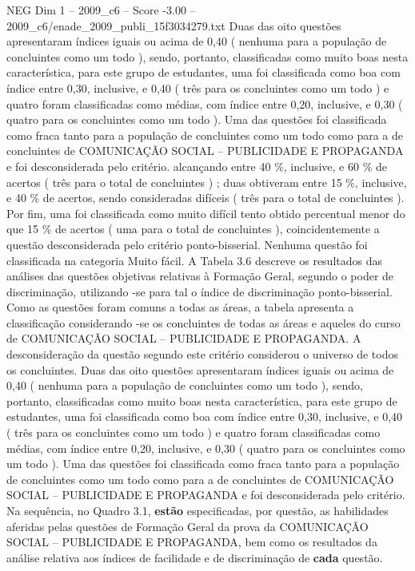 \begin{textsample}{NEG Dim 1 – 2009\_c6 – Score -3.00 – 2009\_c6/enade\_2009\_publi\_15f3034279.txt}
Duas das oito questões apresentaram índices iguais ou acima de 0,40 ( nenhuma para a população de concluintes como um todo ), sendo, portanto, classificadas como muito boas nesta característica, para este grupo de estudantes, uma foi classificada como boa com índice entre 0,30, inclusive, e 0,40 ( três para os concluintes como um todo ) e quatro foram classificadas como médias, com índice entre 0,20, inclusive, e 0,30 ( quatro para os concluintes como um todo ).
Uma das questões foi classificada como fraca tanto para a população de concluintes como um todo como para a de concluintes de COMUNICAÇÃO SOCIAL – PUBLICIDADE E PROPAGANDA e foi desconsiderada pelo critério. alcançando entre 40 \%, inclusive, e 60 \% de acertos ( três para o total de concluintes ) ; duas obtiveram entre 15 \%, inclusive, e 40 \% de acertos, sendo consideradas difíceis ( três para o total de concluintes ).
Por fim, uma foi classificada como muito difícil tento obtido percentual menor do que 15 \% de acertos ( uma para o total de concluintes ), coincidentemente a questão desconsiderada pelo critério ponto-bisserial.
Nenhuma questão foi classificada na categoria Muito fácil.
A Tabela 3.6 descreve os resultados das análises das questões objetivas relativas à Formação Geral, segundo o poder de discriminação, utilizando -se para tal o índice de discriminação ponto-bisserial.
Como as questões foram comuns a todas as áreas, a tabela apresenta a classificação considerando -se os concluintes de todas as áreas e aqueles do curso de COMUNICAÇÃO SOCIAL – PUBLICIDADE E PROPAGANDA.
A desconsideração da questão segundo este critério considerou o universo de todos os concluintes.
Duas das oito questões apresentaram índices iguais ou acima de 0,40 ( nenhuma para a população de concluintes como um todo ), sendo, portanto, classificadas como muito boas nesta característica, para este grupo de estudantes, uma foi classificada como boa com índice entre 0,30, inclusive, e 0,40 ( três para os concluintes como um todo ) e quatro foram classificadas como médias, com índice entre 0,20, inclusive, e 0,30 ( quatro para os concluintes como um todo ).
Uma das questões foi classificada como fraca tanto para a população de concluintes como um todo como para a de concluintes de COMUNICAÇÃO SOCIAL – PUBLICIDADE E PROPAGANDA e foi desconsiderada pelo critério.
Na sequência, no Quadro 3.1, \textbf{estão} especificadas, por questão, as habilidades aferidas pelas questões de Formação Geral da prova da COMUNICAÇÃO SOCIAL – PUBLICIDADE E PROPAGANDA, bem como os resultados da análise relativa aos índices de facilidade e de discriminação de \textbf{cada} questão.

\end{textsample}

